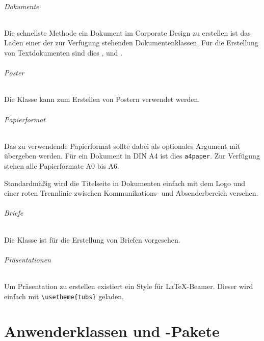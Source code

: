 \documentclass[%
  a4paper,%
  11pt,%
  twoside=false,%
  rgb,%
  extramargin,%
  parskip=half,%
]{tubsbook}
\begin{document}
\paragraph{Dokumente}
Die schnellste Methode ein Dokument im Corporate Design zu erstellen ist
das Laden einer der zur Verfügung stehenden Dokumentenklassen.
Für die Erstellung von Textdokumenten sind dies ,
 und .

\paragraph{Poster}
Die Klasse  kann zum Erstellen von Postern verwendet werden.

\paragraph{Papierformat}
Das zu verwendende Papierformat sollte dabei als optionales Argument mit
übergeben werden. Für ein Dokument in DIN A4 ist dies \texttt{a4paper}.
Zur Verfügung stehen alle Papierformate A0 bis A6.

Standardmäßig wird die Titelseite in Dokumenten einfach mit dem Logo und einer
roten Trennlinie zwischen Kommunikations- und Absenderbereich versehen.

\paragraph{Briefe}

Die Klasse  ist für die Erstellung von Briefen
vorgesehen.

\paragraph{Präsentationen}
Um Präsentation zu erstellen existiert ein Style für \LaTeX-Beamer.
Dieser wird einfach mit \lstinline!\usetheme{tubs}! geladen.

\part{Anwenderklassen und -Pakete}



\end{document}
